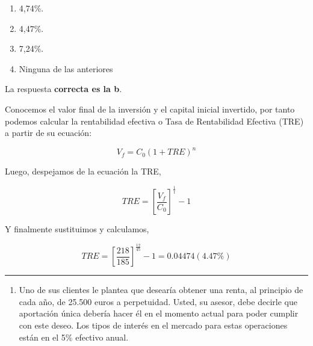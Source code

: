\documentclass[
  letterpaper,
  DIV=11,
  numbers=noendperiod]{scrreprt}
\providecommand{\tightlist}{%
  \setlength{\itemsep}{0pt}\setlength{\parskip}{0pt}}\usepackage{longtable,booktabs,array}
\begin{document}
\begin{enumerate}
\def\labelenumi{\alph{enumi}.}
\item
  4,74\%.
\item
  4,47\%.
\item
  7,24\%.
\item
  Ninguna de las anteriores
\end{enumerate}

\begin{tcolorbox}[enhanced jigsaw, left=2mm, opacityback=0, colback=white, breakable, arc=.35mm, bottomrule=.15mm, rightrule=.15mm, toprule=.15mm, leftrule=.75mm, colframe=quarto-callout-tip-color-frame]
\begin{minipage}[t]{5.5mm}
\textcolor{quarto-callout-tip-color}{\faLightbulb}
\end{minipage}%
\begin{minipage}[t]{\textwidth - 5.5mm}

La respuesta \textbf{correcta es la b}.

Conocemos el valor final de la inversión y el capital inicial invertido,
por tanto podemos calcular la rentabilidad efectiva o Tasa de
Rentabilidad Efectiva (TRE) a partir de su ecuación:

\[{ V }_{ f }={ C }_{ 0 }{ (1+TRE) }^{ n }\]

Luego, despejamos de la ecuación la TRE,

\[{ { { TRE=}\left[ \frac { { V}_{ f } }{ { C }_{ 0 } }  \right]  }^{ \frac { 1 }{ t }  } }-1\]

Y finalmente sustituimos y calculamos,

\[{ { { TRE=}\left[ \frac {218}{ 185 }  \right]  }^{ \frac { 12 }{ 45 }  } }-1=0.04474(4.47\%)\]

\end{minipage}%
\end{tcolorbox}

\begin{center}\rule{0.5\linewidth}{0.5pt}\end{center}

\begin{enumerate}
\def\labelenumi{\arabic{enumi}.}
\setcounter{enumi}{79}
\tightlist
\item
  Uno de sus clientes le plantea que desearía obtener una renta, al
  principio de cada año, de 25.500 euros a perpetuidad. Usted, su
  asesor, debe decirle que aportación única debería hacer él en el
  momento actual para poder cumplir con este deseo. Los tipos de interés
  en el mercado para estas operaciones están en el 5\% efectivo anual.
\end{enumerate}
\end{document}
